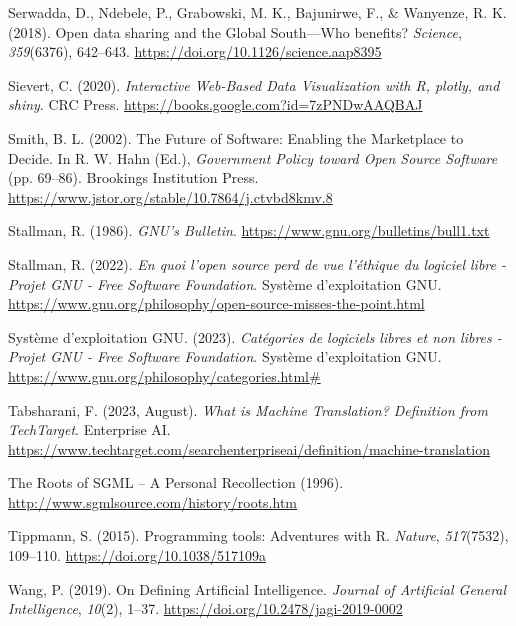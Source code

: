 \documentclass[
  letterpaper,
  DIV=11,
  numbers=noendperiod]{scrreprt}
\newlength{\cslhangindent}
\newenvironment{CSLReferences}[2] %
 {\begin{list}{}{%
  \setlength{\itemindent}{0pt}
  \setlength{\leftmargin}{0pt}
  \setlength{\parsep}{0pt}
  \ifodd #1
   \setlength{\leftmargin}{\cslhangindent}
   \setlength{\itemindent}{-1\cslhangindent}
  \fi
  \setlength{\itemsep}{#2\baselineskip}}}
 {\end{list}}
\begin{document}
\begin{CSLReferences}{1}{0}
Serwadda, D., Ndebele, P., Grabowski, M. K., Bajunirwe, F., \& Wanyenze,
R. K. (2018). Open data sharing and the {Global South}---{Who} benefits?
\emph{Science}, \emph{359}(6376), 642--643.
\url{https://doi.org/10.1126/science.aap8395}

Sievert, C. (2020). \emph{Interactive {Web-Based Data Visualization}
with {R}, plotly, and shiny}. CRC Press.
\url{https://books.google.com?id=7zPNDwAAQBAJ}

Smith, B. L. (2002). The {Future} of {Software}: {Enabling} the
{Marketplace} to {Decide}. In R. W. Hahn (Ed.), \emph{Government
{Policy} toward {Open Source Software}} (pp. 69--86). Brookings
Institution Press.
\url{https://www.jstor.org/stable/10.7864/j.ctvbd8kmv.8}

Stallman, R. (1986). \emph{{GNU}'s {Bulletin}}.
\url{https://www.gnu.org/bulletins/bull1.txt}

Stallman, R. (2022). \emph{En quoi l'open source perd de vue l'éthique
du logiciel libre - {Projet GNU} - {Free Software Foundation}}. Système
d'exploitation GNU.
\url{https://www.gnu.org/philosophy/open-source-misses-the-point.html}

Système d'exploitation GNU. (2023). \emph{Catégories de logiciels libres
et non libres - {Projet GNU} - {Free Software Foundation}}. Système
d'exploitation GNU.
\url{https://www.gnu.org/philosophy/categories.html\#}

Tabsharani, F. (2023, August). \emph{What is {Machine Translation}?
{Definition} from {TechTarget}}. Enterprise AI.
\url{https://www.techtarget.com/searchenterpriseai/definition/machine-translation}

The {Roots} of {SGML} -- {A Personal Recollection} (1996).
\url{http://www.sgmlsource.com/history/roots.htm}

Tippmann, S. (2015). Programming tools: {Adventures} with {R}.
\emph{Nature}, \emph{517}(7532), 109--110.
\url{https://doi.org/10.1038/517109a}

Wang, P. (2019). On {Defining Artificial Intelligence}. \emph{Journal of
Artificial General Intelligence}, \emph{10}(2), 1--37.
\url{https://doi.org/10.2478/jagi-2019-0002}


\end{CSLReferences}
\end{document}
